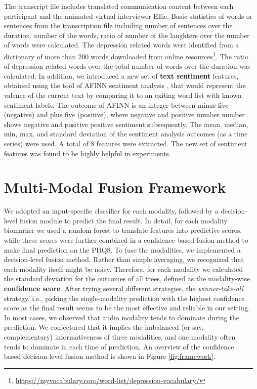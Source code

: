 \documentclass[letterpaper]{article} %
\begin{document}
The transcript file includes translated communication content between each participant and the animated virtual interviewer Ellie. Basic statistics of words or sentences from the transcription file including number of sentences over the duration, number of the words, ratio of number of the laughters over the number of words were calculated. The depression related words were identified from a dictionary of more than 200 words downloaded from online resources\footnote{\url{https://myvocabulary.com/word-list/depression-vocabulary/}}. The ratio of depression-related words over the total number of words over the duration was calculated.  In addition, we introduced a new set of \textbf{text sentiment} features, obtained using the tool of AFINN sentiment analysis \cite{nielsen2011new}, that would represent the valence of the current text by comparing it to an exiting word list with known sentiment labels. The outcome of AFINN is an integer between minus five (negative) and plus five (positive), where negative and positive number number shows negative and positive positive sentiment subsequently. The mean, median, min, max, and standard deviation of the sentiment analysis outcomes (as a time series) were used. A total of 8 features were extracted. The new set of sentiment features was found to be highly helpful in experiments.

\vspace{-2.33mm}
\section{Multi-Modal Fusion Framework}

We adopted an input-specific classifier for each modality, followed by a decision-level fusion module to predict the final result. In detail, for each modality biomarker we used a random forest to translate features into predictive scores, while these scores were further combined in a confidence based fusion method to make final prediction on the PHQ8. To fuse the modalities, we implemented a decision-level fusion method. Rather than simple averaging, we recognized that each modality itself might be noisy. Therefore, for each modality we calculated the standard deviation for the outcomes of all trees, defined as the modality-wise \textbf{confidence score}. After trying several different strategies, the \textit{winner-take-all} strategy, i.e., picking the single-modality prediction with the highest confidence score as the final result seems to be the most effective and reliable in our setting. In most cases, we observed that audio modality tends to dominate during the prediction. We conjectured that it implies the imbalanced (or say, complementary) informativeness of three modalities, and one modality often tends to dominate in each time of prediction. An overview of the confidence based decision-level fusion method is shown in Figure \ref{fig:framework}.
\end{document}
